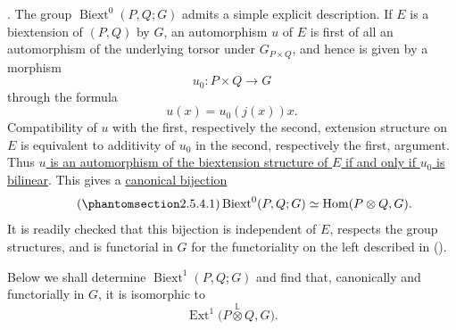 . The group $\operatorname{Biext}^{0}(P,Q;G)$ admits a simple
explicit description. If $E$ is a biextension of $(P,Q)$ by $G$, an
automorphism $u$ of $E$ is first of all an automorphism of the
underlying torsor under $G_{P\times Q}$, and hence is given by a
morphism
\[
 u_0:P\times Q\longrightarrow G
\]
through the formula
\[
 u(x)=u_0(j(x))x.
\]
Compatibility of $u$ with the first, respectively the second,
extension structure on $E$ is equivalent to additivity of $u_0$ in
the second, respectively the first, argument. Thus
\underline{$u$ is an automorphism of the biextension structure of $E$
if and only if $u_0$ is bilinear}. This gives a
\underline{canonical bijection}
\begin{equation}\tag{\SGARefTarget{sga7.sga7i.evii.n2-5-4-1}{2.5.4.1}}
 \operatorname{Biext}^{0}(P,Q;G)
 \simeq
 \operatorname{Hom}(P\otimes Q,G).
\end{equation}
It is readily checked that this bijection is independent of $E$,
respects the group structures, and is functorial in $G$ for the
functoriality on the left described in ().

Below we shall determine $\operatorname{Biext}^{1}(P,Q;G)$ and find
that, canonically and functorially in $G$, it is isomorphic to
\[
 \operatorname{Ext}^{1}
 \bigl(P\overset{\mathbb L}{\otimes}Q,G\bigr).
\]

